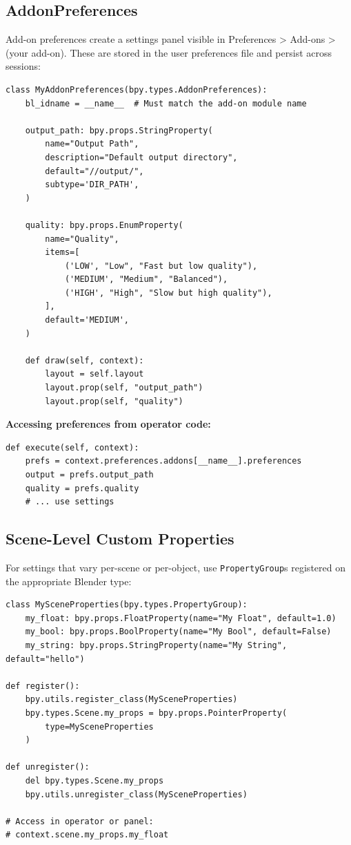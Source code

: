 \subsection{AddonPreferences}

Add-on preferences create a settings panel visible in Preferences > Add-ons > (your add-on). These are stored in the user preferences file and persist across sessions:

\begin{lstlisting}
class MyAddonPreferences(bpy.types.AddonPreferences):
    bl_idname = __name__  # Must match the add-on module name

    output_path: bpy.props.StringProperty(
        name="Output Path",
        description="Default output directory",
        default="//output/",
        subtype='DIR_PATH',
    )

    quality: bpy.props.EnumProperty(
        name="Quality",
        items=[
            ('LOW', "Low", "Fast but low quality"),
            ('MEDIUM', "Medium", "Balanced"),
            ('HIGH', "High", "Slow but high quality"),
        ],
        default='MEDIUM',
    )

    def draw(self, context):
        layout = self.layout
        layout.prop(self, "output_path")
        layout.prop(self, "quality")
\end{lstlisting}

\textbf{Accessing preferences from operator code:}

\begin{lstlisting}
def execute(self, context):
    prefs = context.preferences.addons[__name__].preferences
    output = prefs.output_path
    quality = prefs.quality
    # ... use settings
\end{lstlisting}

\subsection{Scene-Level Custom Properties}

For settings that vary per-scene or per-object, use \texttt{PropertyGroup}s registered on the appropriate Blender type:

\begin{lstlisting}
class MySceneProperties(bpy.types.PropertyGroup):
    my_float: bpy.props.FloatProperty(name="My Float", default=1.0)
    my_bool: bpy.props.BoolProperty(name="My Bool", default=False)
    my_string: bpy.props.StringProperty(name="My String", default="hello")

def register():
    bpy.utils.register_class(MySceneProperties)
    bpy.types.Scene.my_props = bpy.props.PointerProperty(
        type=MySceneProperties
    )

def unregister():
    del bpy.types.Scene.my_props
    bpy.utils.unregister_class(MySceneProperties)

# Access in operator or panel:
# context.scene.my_props.my_float
\end{lstlisting}


